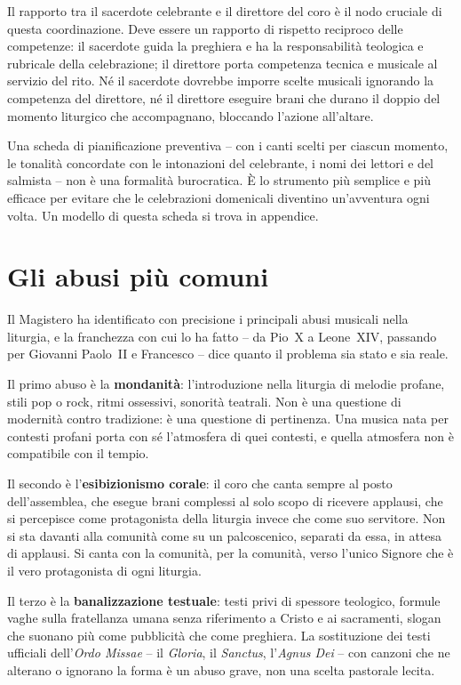 \documentclass[12pt,a4paper]{article}
\begin{document}
	Il rapporto tra il sacerdote celebrante e il direttore del coro è il nodo
	cruciale di questa coordinazione. Deve essere un rapporto di rispetto reciproco
	delle competenze: il sacerdote guida la preghiera e ha la responsabilità
	teologica e rubricale della celebrazione; il direttore porta competenza tecnica e
	musicale al servizio del rito. Né il sacerdote dovrebbe imporre scelte musicali
	ignorando la competenza del direttore, né il direttore eseguire brani che durano
	il doppio del momento liturgico che accompagnano, bloccando l'azione all'altare.
	
	Una scheda di pianificazione preventiva -- con i canti scelti per ciascun
	momento, le tonalità concordate con le intonazioni del celebrante, i nomi dei
	lettori e del salmista -- non è una formalità burocratica. È lo strumento più
	semplice e più efficace per evitare che le celebrazioni domenicali diventino
	un'avventura ogni volta. Un modello di questa scheda si trova in appendice.
	
	\section{Gli abusi più comuni}
	
	Il Magistero ha identificato con precisione i principali abusi musicali nella
	liturgia, e la franchezza con cui lo ha fatto -- da Pio~X a Leone~XIV, passando
	per Giovanni Paolo~II e Francesco -- dice quanto il problema sia stato e sia
	reale.
	
	Il primo abuso è la \textbf{mondanità}: l'introduzione nella liturgia di melodie
	profane, stili pop o rock, ritmi ossessivi, sonorità teatrali. Non è una
	questione di modernità contro tradizione: è una questione di pertinenza. Una
	musica nata per contesti profani porta con sé l'atmosfera di quei contesti, e
	quella atmosfera non è compatibile con il tempio.
	
	Il secondo è l'\textbf{esibizionismo corale}: il coro che canta sempre al posto
	dell'assemblea, che esegue brani complessi al solo scopo di ricevere applausi,
	che si percepisce come protagonista della liturgia invece che come suo servitore.
	Non si sta davanti alla comunità come su un palcoscenico, separati da essa, in
	attesa di applausi. Si canta con la comunità, per la comunità, verso l'unico
	Signore che è il vero protagonista di ogni liturgia.
	
	Il terzo è la \textbf{banalizzazione testuale}: testi privi di spessore
	teologico, formule vaghe sulla fratellanza umana senza riferimento a Cristo e ai
	sacramenti, slogan che suonano più come pubblicità che come preghiera. La
	sostituzione dei testi ufficiali dell'\emph{Ordo Missae} -- il \emph{Gloria}, il
	\emph{Sanctus}, l'\emph{Agnus Dei} -- con canzoni che ne alterano o ignorano la
	forma è un abuso grave, non una scelta pastorale lecita.
	
\end{document}
